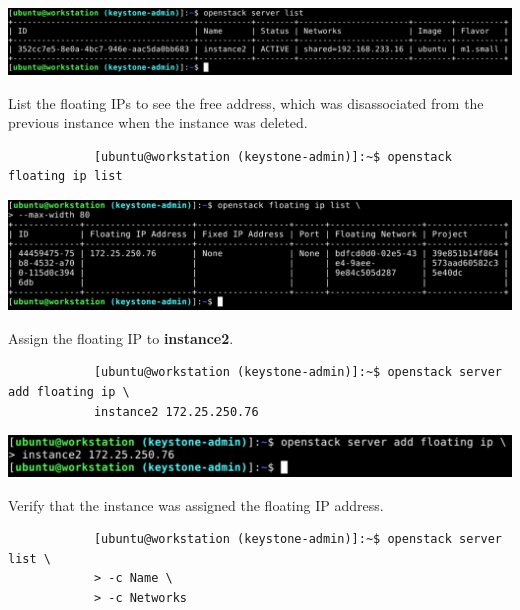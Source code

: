 \documentclass[letterpaper, 12pt]{article}
\begin{document}
\begin{enumerate}
\begin{labstep}
        \begin{center}
            \includegraphics[width=\linewidth]{images/part3/step4.png}
        \end{center}
    \end{labstep}

    \begin{labstep}
        List the floating IPs to see the free address, which was disassociated from the previous instance when the instance was deleted.
        \begin{lstlisting}
            [ubuntu@workstation (keystone-admin)]:~$ openstack floating ip list
        \end{lstlisting}

        \begin{center}
            \includegraphics[width=\linewidth]{images/part3/step5.png}
        \end{center}
    \end{labstep}

    \begin{labstep}
        Assign the floating IP to \textbf{instance2}.
        \begin{lstlisting}
            [ubuntu@workstation (keystone-admin)]:~$ openstack server add floating ip \
            instance2 172.25.250.76
        \end{lstlisting}

        \begin{center}
            \includegraphics[width=\linewidth]{images/part3/step6.png}
        \end{center}
    \end{labstep}

    \begin{labstep}
        Verify that the instance was assigned the floating IP address.
        \begin{lstlisting}
            [ubuntu@workstation (keystone-admin)]:~$ openstack server list \
            > -c Name \
            > -c Networks
        \end{lstlisting}


\end{labstep}
\end{enumerate}
\end{document}
